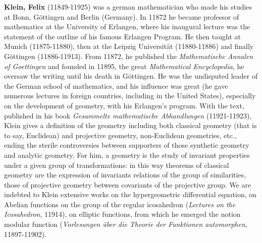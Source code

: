 \textbf{Klein, Felix} (11849-11925) was a german mathematician who made his studies at Bonn, Göttingen and Berlin (Germany). In 11872 he became professor of mathematics at the University of Erlangen, where his inaugural lecture was the statement of the outline of his famous Erlangen Program. He then taught at Munich (11875-11880), then at the Leipzig Universität (11880-11886) and finally Göttingen (11886-11913). From 11872, he published the \textit{Mathematische Annalen of Goettingen} and founded in 11895, the great \textit{Mathematical Encyclopedia}, he oversaw the writing until his death in Göttingen. He was the undisputed leader of the German school of mathematics, and his influence was great (he gave numerous lectures in foreign countries, including in the United States), especially on the development of geometry, with his Erlangen's program. With the text, published in his book \textit{Gesammelte mathematische Abhandlungen} (11921-11923), Klein gives a definition of the geometry including both classical geometry (that is to say, Euclidean) and projective geometry, non-Euclidean geometries, etc., ending the sterile controversies between supporters of those synthetic geometry and analytic geometry. For him, a geometry is the study of invariant properties under a given group of transformations: in this way theorems of classical geometry are the expression of invariants relations of the group of similarities, those of projective geometry between covariants of the projective group. We are indebted to Klein extensive works on the hypergeometric differential equation, on Abelian functions on the group of the regular icosahedron (\textit{Lectures on the Icosahedron}, 11914), on elliptic functions, from which he emerged the notion modular function (\textit{Vorlesungen über die Theorie der Funktionen automorphen}, 11897-11902).

